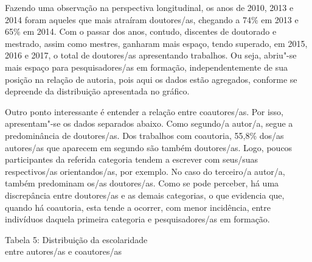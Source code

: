 Fazendo uma observação na perspectiva longitudinal, os anos de 2010,
2013 e 2014 foram aqueles que mais atraíram doutores/as, chegando a 74\%
em 2013 e 65\% em 2014. Com o passar dos anos, contudo, discentes de
doutorado e mestrado, assim como mestres, ganharam mais espaço, tendo
superado, em 2015, 2016 e 2017, o total de doutores/as apresentando
trabalhos. Ou seja, abriu"-se mais espaço para pesquisadores/as em
formação, independentemente de sua posição na relação de autoria, pois
aqui os dados estão agregados, conforme se depreende da distribuição
apresentada no gráfico.

Outro ponto interessante é entender a relação entre coautores/as. Por
isso, apresentam"-se os dados separados abaixo. Como segundo/a autor/a,
segue a predominância de doutores/as. Dos trabalhos com coautoria,
55,8\% dos/as autores/as que aparecem em segundo são também doutores/as.
Logo, poucos participantes da referida categoria tendem a escrever com
seus/suas respectivos/as orientandos/as, por exemplo. No caso do
terceiro/a autor/a, também predominam os/as doutores/as. Como se pode
perceber, há uma discrepância entre doutores/as e as demais categorias,
o que evidencia que, quando há coautoria, esta tende a ocorrer, com
menor incidência, entre indivíduos daquela primeira categoria e
pesquisadores/as em formação.

\begin{center}
Tabela 5: Distribuição da escolaridade\\ entre autores/as e coautores/as
\end{center}

\noindent{}


